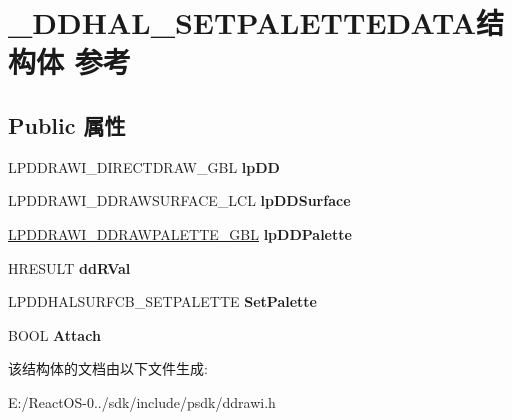 \hypertarget{struct___d_d_h_a_l___s_e_t_p_a_l_e_t_t_e_d_a_t_a}{}\section{\+\_\+\+D\+D\+H\+A\+L\+\_\+\+S\+E\+T\+P\+A\+L\+E\+T\+T\+E\+D\+A\+T\+A结构体 参考}
\label{struct___d_d_h_a_l___s_e_t_p_a_l_e_t_t_e_d_a_t_a}
\subsection*{Public 属性}
\begin{DoxyCompactItemize}
\item 
\mbox{\label{struct___d_d_h_a_l___s_e_t_p_a_l_e_t_t_e_d_a_t_a_ab2f172fc6a8d04a7c0a3a3a5eb930bab}} 
L\+P\+D\+D\+R\+A\+W\+I\+\_\+\+D\+I\+R\+E\+C\+T\+D\+R\+A\+W\+\_\+\+G\+BL {\bfseries lp\+DD}
\item 
\mbox{\label{struct___d_d_h_a_l___s_e_t_p_a_l_e_t_t_e_d_a_t_a_a7d801f103a97ed4a57a3623c7ec25e36}} 
L\+P\+D\+D\+R\+A\+W\+I\+\_\+\+D\+D\+R\+A\+W\+S\+U\+R\+F\+A\+C\+E\+\_\+\+L\+CL {\bfseries lp\+D\+D\+Surface}
\item 
\mbox{\label{struct___d_d_h_a_l___s_e_t_p_a_l_e_t_t_e_d_a_t_a_a7592de448b9c166a89568ef0fd4d681d}} 
\hyperlink{struct___d_d_r_a_w_i___d_d_r_a_w_p_a_l_e_t_t_e___g_b_l}{L\+P\+D\+D\+R\+A\+W\+I\+\_\+\+D\+D\+R\+A\+W\+P\+A\+L\+E\+T\+T\+E\+\_\+\+G\+BL} {\bfseries lp\+D\+D\+Palette}
\item 
\mbox{\label{struct___d_d_h_a_l___s_e_t_p_a_l_e_t_t_e_d_a_t_a_afcca7524df9c2933c111d56598bc251b}} 
H\+R\+E\+S\+U\+LT {\bfseries dd\+R\+Val}
\item 
\mbox{\label{struct___d_d_h_a_l___s_e_t_p_a_l_e_t_t_e_d_a_t_a_a8d9caf1b557c2f0963825fc83ea40aa3}} 
L\+P\+D\+D\+H\+A\+L\+S\+U\+R\+F\+C\+B\+\_\+\+S\+E\+T\+P\+A\+L\+E\+T\+TE {\bfseries Set\+Palette}
\item 
\mbox{\label{struct___d_d_h_a_l___s_e_t_p_a_l_e_t_t_e_d_a_t_a_ab82aac1f38bd5c465253fa61e3bcb53f}} 
B\+O\+OL {\bfseries Attach}
\end{DoxyCompactItemize}


该结构体的文档由以下文件生成\+:\begin{DoxyCompactItemize}
\item 
E\+:/\+React\+O\+S-\/0../sdk/include/psdk/ddrawi.\+h\end{DoxyCompactItemize}
